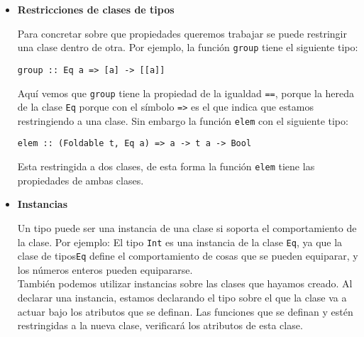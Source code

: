 \begin{itemize}
\item \textbf{Restricciones de clases de tipos}

Para concretar sobre que propiedades queremos trabajar se puede restringir una clase dentro de otra. Por ejemplo, la función \texttt{group} tiene el siguiente tipo:
\begin{center}
\texttt{group :: Eq a => [a] -> [[a]]}
\end{center}
Aquí vemos que \texttt{group} tiene la propiedad de la igualdad \texttt{==}, porque la hereda de la clase \texttt{Eq} porque con el símbolo \texttt{=>} es el que indica que estamos restringiendo a una clase. Sin embargo la función \texttt{elem} con el siguiente tipo:
\begin{center}
\texttt{elem :: (Foldable t, Eq a) => a -> t a -> Bool}
\end{center}
Esta restringida a dos clases, de esta forma la función \texttt{elem} tiene las propiedades de ambas clases.\\ 

\item \textbf{Instancias}

Un tipo puede ser una instancia de una clase si soporta el comportamiento de la clase. Por ejemplo:  El tipo \texttt{Int} es una instancia de la clase \texttt{Eq}, ya que la clase de tipos\texttt{Eq} define el comportamiento de cosas que se pueden equiparar, y los números enteros pueden equipararse.\\

También podemos utilizar instancias sobre las clases que hayamos creado. Al declarar una instancia, estamos declarando el tipo sobre el que la clase va a actuar bajo los atributos que se definan. Las funciones que se definan y estén restringidas a la nueva clase, verificará los atributos de esta clase.

\end{itemize}


